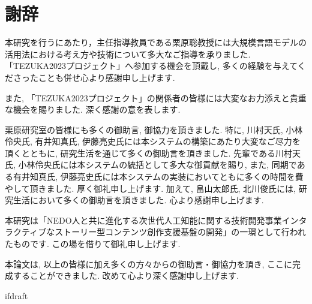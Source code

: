 \documentclass[a4paper,12pt]{jreport}
\begin{document}
\fi

\chapter*{謝辞}
本研究を行うにあたり，主任指導教員である栗原聡教授には大規模言語モデルの活用法における考え方や技術について多大なご指導を承りました.「TEZUKA2023プロジェクト」へ参加する機会を頂戴し, 多くの経験を与えてくださったことも併せ心より感謝申し上げます.

また, 「TEZUKA2023プロジェクト」の関係者の皆様には大変なお力添えと貴重な機会を賜りました. 深く感謝の意を表します.

栗原研究室の皆様にも多くの御助言, 御協力を頂きました. 特に, 川村天氏, 小林伶央氏, 有井知真氏, 伊藤亮史氏には本システムの構築にあたり大変なご尽力を頂くとともに, 研究生活を通じて多くの御助言を頂きました. 先輩である川村天氏, 小林伶央氏には本システムの統括として多大な御貢献を賜り, また, 同期である有井知真氏, 伊藤亮史氏には本システムの実装においてともに多くの時間を費やして頂きました. 厚く御礼申し上げます. 加えて, 畠山太郎氏, 北川俊氏には, 研究生活において多くの御助言を頂きました. 心より感謝申し上げます.

本研究は「NEDO人と共に進化する次世代人工知能に関する技術開発事業インタラクティブなストーリー型コンテンツ創作支援基盤の開発」の一環として行われたものです. この場を借りて御礼申し上げます.

本論文は, 以上の皆様に加え多くの方々からの御助言・御協力を頂き, ここに完成することができました. 改めて心より深く感謝申し上げます.

\expandafter\ifx\csname ifdraft\endcsname\relax
   
\end{document}
